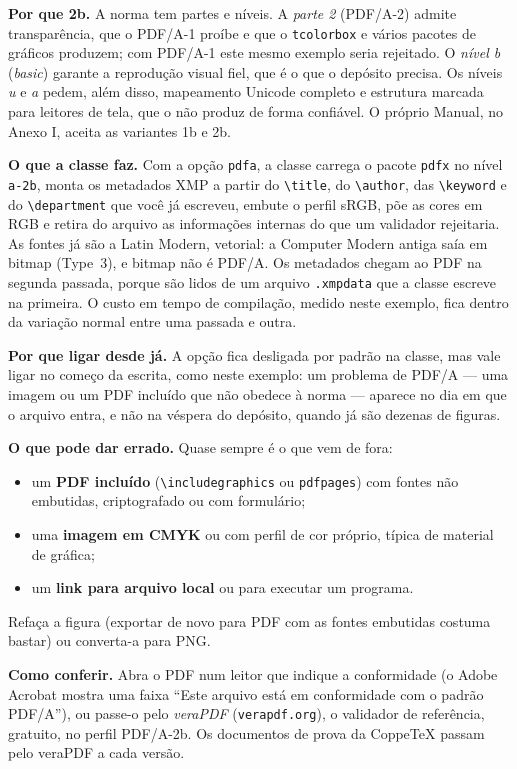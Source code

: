 \documentclass[dsc,pdfa]{coppe}
\begin{document}
\textbf{Por que 2b.} A norma tem partes e níveis. A \emph{parte 2} (PDF/A-2) admite transparência, que o PDF/A-1 proíbe e que o \verb|tcolorbox| e vários pacotes de gráficos produzem; com PDF/A-1 este mesmo exemplo seria rejeitado. O \emph{nível b} (\emph{basic}) garante a reprodução visual fiel, que é o que o depósito precisa. Os níveis \emph{u} e \emph{a} pedem, além disso, mapeamento Unicode completo e estrutura marcada para leitores de tela, que o  não produz de forma confiável. O próprio Manual, no Anexo I, aceita as variantes 1b e 2b.

\textbf{O que a classe faz.} Com a opção \verb|pdfa|, a classe carrega o pacote \verb|pdfx| no nível \verb|a-2b|, monta os metadados XMP a partir do \verb|\title|, do \verb|\author|, das \verb|\keyword| e do \verb|\department| que você já escreveu, embute o perfil sRGB, põe as cores em RGB e retira do arquivo as informações internas do  que um validador rejeitaria. As fontes já são a Latin Modern, vetorial: a Computer Modern antiga saía em bitmap (Type~3), e bitmap não é PDF/A. Os metadados chegam ao PDF na segunda passada, porque são lidos de um arquivo \verb|.xmpdata| que a classe escreve na primeira. O custo em tempo de compilação, medido neste exemplo, fica dentro da variação normal entre uma passada e outra.

\textbf{Por que ligar desde já.} A opção fica desligada por padrão na classe, mas vale ligar no começo da escrita, como neste exemplo: um problema de PDF/A --- uma imagem ou um PDF incluído que não obedece à norma --- aparece no dia em que o arquivo entra, e não na véspera do depósito, quando já são dezenas de figuras.

\textbf{O que pode dar errado.} Quase sempre é o que vem de fora:
\begin{itemize}
  \item um \textbf{PDF incluído} (\verb|\includegraphics| ou \verb|pdfpages|) com fontes não embutidas, criptografado ou com formulário;
  \item uma \textbf{imagem em CMYK} ou com perfil de cor próprio, típica de material de gráfica;
  \item um \textbf{link para arquivo local} ou para executar um programa.
\end{itemize}
Refaça a figura (exportar de novo para PDF com as fontes embutidas costuma bastar) ou converta-a para PNG.

\textbf{Como conferir.} Abra o PDF num leitor que indique a conformidade (o Adobe Acrobat mostra uma faixa ``Este arquivo está em conformidade com o padrão PDF/A''), ou passe-o pelo \emph{veraPDF} (\texttt{verapdf.org}), o validador de referência, gratuito, no perfil PDF/A-2b. Os documentos de prova da CoppeTeX passam pelo veraPDF a cada versão.
\end{document}
